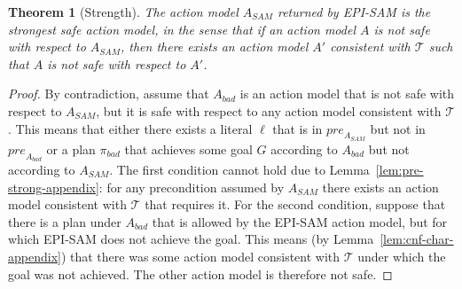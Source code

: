 \documentclass[letterpaper]{article} %
\newcommand{\pre}{\textit{pre}}
\newcommand{\sam}{\textit{SAM}\xspace}
\newcommand{\ispre}{\textit{IsPre}}
\newtheorem{theorem}{Theorem}
\begin{document}

\begin{theorem}[Strength]
The action model $A_\sam$ returned by EPI-SAM is the strongest safe action model, 
in the sense that if an action model $A$ is not safe with respect to $A_\sam$, 
then there exists an action model $A'$ consistent with $\mathcal{T}$ 
such that $A$ is not safe with respect to $A'$. 
\end{theorem}
\begin{proof}
By contradiction, assume that $A_{bad}$ is an action model that is not safe with respect to $A_{\sam}$, but it is safe with respect to any action model consistent with $\mathcal{T}$.   
This means that either there exists a literal $\ell$ that is in 
$\pre_{A_\sam}$ but not in $\pre_{A_{bad}}$ 
or a plan $\pi_{bad}$ that 
achieves some goal $G$ according to $A_{bad}$ but not according to $A_\sam$. 
The first condition cannot hold due to Lemma~\ref{lem:pre-strong-appendix}: for any precondition assumed by $A_\sam$ there exists an action model consistent with $\mathcal{T}$ that requires it. 
For the second condition, suppose that there is a plan under $A_{bad}$ that is allowed by the EPI-SAM action model, but for which EPI-SAM does not achieve the goal. This means (by Lemma~\ref{lem:cnf-char-appendix}) that there was some action model consistent with $\mathcal{T}$ under which the goal was not achieved. The other action model is therefore not safe.
%
\end{proof}
\end{document}
